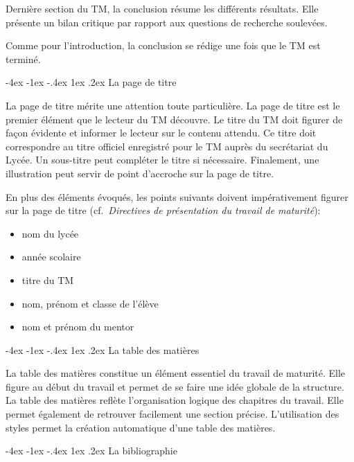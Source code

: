 \documentclass[
  a4paper,
]{book}
\makeatletter
\providecommand{\tightlist}{%
  \setlength{\itemsep}{0pt}\setlength{\parskip}{0pt}}\usepackage{longtable,booktabs,array}
\providecommand{\tightlist}{%
  \setlength{\itemsep}{0pt}\setlength{\parskip}{0pt}}
\renewcommand{\section}{\@startsection{section}{1}{\z@}
{-4ex \@plus -1ex \@minus -.4ex}
{1ex \@plus.2ex }
{\normalfont\large\sffamily\bfseries}}
\newlength\esp
\makeatother
\begin{document}
Dernière section du TM, la conclusion résume les différents résultats.
Elle présente un bilan critique par rapport aux questions de recherche
soulevées.

Comme pour l'introduction, la conclusion se rédige une fois que le TM
est terminé.

\hypertarget{la-page-de-titre}{%
\section{La page de titre}\label{la-page-de-titre}}

La page de titre mérite une attention toute particulière. La page de
titre est le premier élément que le lecteur du TM découvre. Le titre du
TM doit figurer de façon évidente et informer le lecteur sur le contenu
attendu. Ce titre doit correspondre au titre officiel enregistré pour le
TM auprès du secrétariat du Lycée. Un sous-titre peut compléter le titre
si nécessaire. Finalement, une illustration peut servir de point
d'accroche sur la page de titre.

En plus des éléments évoqués, les points suivants doivent impérativement
figurer sur la page de titre (cf.~\emph{Directives de présentation du
travail de maturité}):

\begin{itemize}
\tightlist
\item
  nom du lycée
\item
  année scolaire
\item
  titre du TM
\item
  nom, prénom et classe de l'élève
\item
  nom et prénom du mentor
\end{itemize}

\hypertarget{la-table-des-matiuxe8res}{%
\section{La table des matières}\label{la-table-des-matiuxe8res}}

La table des matières constitue un élément essentiel du travail de
maturité. Elle figure au début du travail et permet de se faire une idée
globale de la structure. La table des matières reflète l'organisation
logique des chapitres du travail. Elle permet également de retrouver
facilement une section précise. L'utilisation des styles permet la
création automatique d'une table des matières.

\hypertarget{la-bibliographie}{%
\section{La bibliographie}\label{la-bibliographie}}
\end{document}
